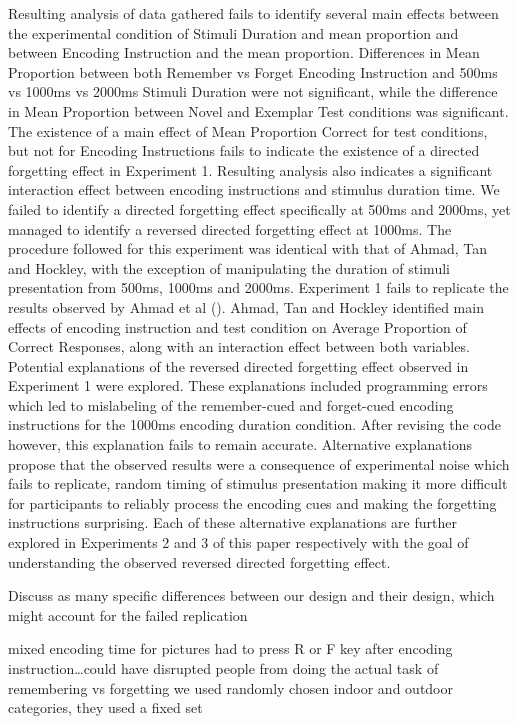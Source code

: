 \documentclass[
  english,
  man,floatsintext]{apa6}
\begin{document}
Resulting analysis of data gathered fails to identify several main effects between the experimental condition of Stimuli Duration and mean proportion and between Encoding Instruction and the mean proportion. Differences in Mean Proportion between both Remember vs Forget Encoding Instruction and 500ms vs 1000ms vs 2000ms Stimuli Duration were not significant, while the difference in Mean Proportion between Novel and Exemplar Test conditions was significant. The existence of a main effect of Mean Proportion Correct for test conditions, but not for Encoding Instructions fails to indicate the existence of a directed forgetting effect in Experiment 1. Resulting analysis also indicates a significant interaction effect between encoding instructions and stimulus duration time. We failed to identify a directed forgetting effect specifically at 500ms and 2000ms, yet managed to identify a reversed directed forgetting effect at 1000ms.
The procedure followed for this experiment was identical with that of Ahmad, Tan and Hockley, with the exception of manipulating the duration of stimuli presentation from 500ms, 1000ms and 2000ms. Experiment 1 fails to replicate the results observed by Ahmad et al (). Ahmad, Tan and Hockley identified main effects of encoding instruction and test condition on Average Proportion of Correct Responses, along with an interaction effect between both variables.
Potential explanations of the reversed directed forgetting effect observed in Experiment 1 were explored. These explanations included programming errors which led to mislabeling of the remember-cued and forget-cued encoding instructions for the 1000ms encoding duration condition. After revising the code however, this explanation fails to remain accurate. Alternative explanations propose that the observed results were a consequence of experimental noise which fails to replicate, random timing of stimulus presentation making it more difficult for participants to reliably process the encoding cues and making the forgetting instructions surprising. Each of these alternative explanations are further explored in Experiments 2 and 3 of this paper respectively with the goal of understanding the observed reversed directed forgetting effect.

Discuss as many specific differences between our design and their design, which might account for the failed replication

mixed encoding time for pictures
had to press R or F key after encoding instruction\ldots could have disrupted people from doing the actual task of remembering vs forgetting
we used randomly chosen indoor and outdoor categories, they used a fixed set
\end{document}
